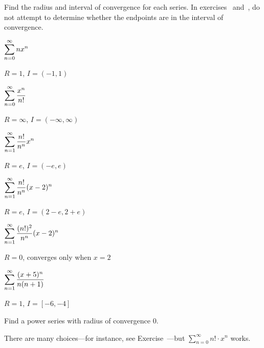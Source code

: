 \begin{exercises}

Find the radius and interval of convergence for each series.  In
exercises~ and~,
do not attempt to determine whether the endpoints are in the
interval of convergence.

\begin{exercise} $\displaystyle\sum_{n=0}^\infty n x^n$
\begin{answer} $R=1$, $I=(-1,1)$
\end{answer}\end{exercise}

\begin{exercise} $\displaystyle\sum_{n=0}^\infty {x^n\over n!}$
\begin{answer} $R=\infty$, $I=(-\infty,\infty)$
\end{answer}\end{exercise}

\begin{exercise} 
\relax\label{exer:no-endpoints-one}
$\displaystyle\sum_{n=1}^\infty {n!\over n^n}x^n$
\begin{answer} $R=e$, $I=(-e,e)$
\end{answer}\end{exercise}

\begin{exercise} 
\relax\label{exer:no-endpoints-two}
$\displaystyle\sum_{n=1}^\infty {n!\over n^n}(x-2)^n$
\begin{answer} $R=e$, $I=(2-e,2+e)$
\end{answer}\end{exercise}

\begin{exercise}
\relax\label{exer:radius-of-convergence-infinity}
 $\displaystyle\sum_{n=1}^\infty {(n!)^2\over n^n}(x-2)^n$
\begin{answer} $R=0$, converges only when $x=2$
\end{answer}\end{exercise}

\begin{exercise} $\displaystyle\sum_{n=1}^\infty {(x+5)^n\over n(n+1)}$
\begin{answer} $R=1$, $I=[-6,-4]$
\end{answer}\end{exercise}

\begin{exercise} Find a power series with radius of convergence $0$.
\begin{answer} There are many choices---for instance, see Exercise~---but $\sum_{n=0}^\infty n! \cdot x^n$ works.
\end{answer}\end{exercise}

\end{exercises}

